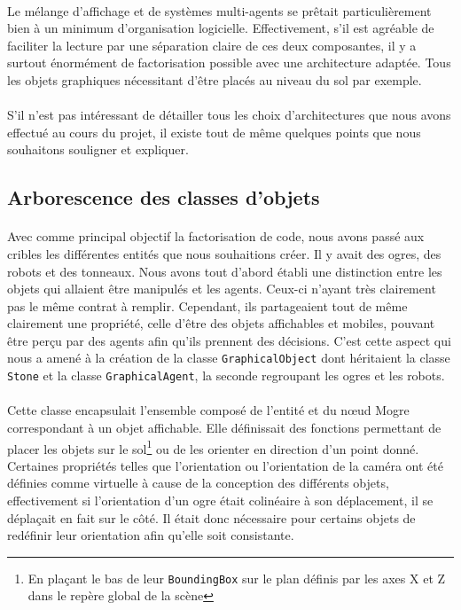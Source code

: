 \paragraph{}
Le mélange d'affichage et de systèmes multi-agents se prêtait particulièrement
bien à un minimum d'organisation logicielle. Effectivement, s'il est agréable
de faciliter la lecture par une séparation claire de ces deux composantes, il
y a surtout énormément de factorisation possible avec une architecture
adaptée. Tous les objets graphiques nécessitant d'être placés au niveau du sol
par exemple.

\paragraph{}
S'il n'est pas intéressant de détailler tous les choix d'architectures que
nous avons effectué au cours du projet, il existe tout de même quelques points
que nous souhaitons souligner et expliquer.

\subsection{Arborescence des classes d'objets}
\paragraph{}
Avec comme principal objectif la factorisation de code, nous avons passé aux
cribles les différentes entités que nous souhaitions créer. Il y avait des
ogres, des robots et des tonneaux. Nous avons tout d'abord établi une
distinction entre les objets qui allaient être manipulés et les agents.
Ceux-ci n'ayant très clairement pas le même contrat à remplir. Cependant, ils
partageaient tout de même clairement une propriété, celle d'être des objets
affichables et mobiles, pouvant être perçu par des agents afin qu'ils prennent
des décisions. C'est cette aspect qui nous a amené à la création de la classe
\verb!GraphicalObject! dont héritaient la classe \verb!Stone! et la classe
\verb!GraphicalAgent!,  la seconde regroupant les ogres et les robots.

\paragraph{}
Cette classe encapsulait l'ensemble composé de l'entité et du nœud Mogre
correspondant à un objet affichable. Elle définissait des fonctions permettant
de placer les objets sur le sol\footnote{En plaçant le bas de leur
\verb!BoundingBox! sur le plan définis par les axes X et Z dans le repère
global de la scène} ou de les orienter en direction d'un point donné.
Certaines propriétés telles que l'orientation ou l'orientation de la caméra
ont été définies comme virtuelle à cause de la conception des différents
objets, effectivement si l'orientation d'un ogre était colinéaire à son
déplacement, il se déplaçait en fait sur le côté. Il était donc nécessaire
pour certains objets de redéfinir leur orientation afin qu'elle soit
consistante.

